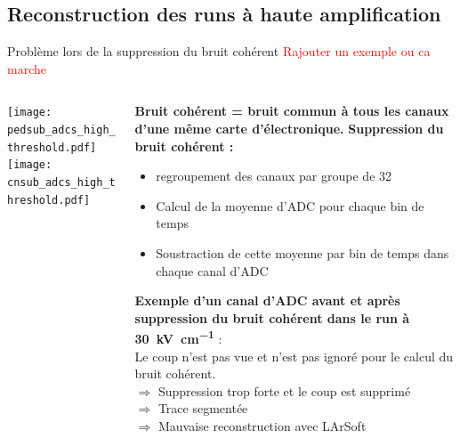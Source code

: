    \subsection{Reconstruction des runs à haute amplification}
    
    \begin{frame}{Problème lors de la suppression du bruit cohérent}
        \textcolor{red}{Rajouter un exemple ou ca marche}
        \begin{scriptsize}
            \begin{columns}
                \begin{column}{0.5\textwidth}
                    \centering \texttt{[image: pedsub\_adcs\_high\_threshold.pdf]}\\
                    \centering \texttt{[image: cnsub\_adcs\_high\_threshold.pdf]}\\
                 \end{column}
                \begin{column}{0.5\textwidth}
                    \textbf{Bruit cohérent = bruit commun à tous les canaux d'une même carte d'électronique.} 
                    \textbf{Suppression du bruit cohérent :} 
                    \begin{itemize}
                        \item regroupement des canaux par groupe de 32
                        \item Calcul de la moyenne d'ADC pour chaque bin de temps
                        \item Soustraction de cette moyenne par bin de temps dans chaque canal d'ADC
                    \end{itemize}
                   \textbf{ Exemple d'un canal d'ADC avant et après suppression du bruit cohérent dans le run à \SI{30}{\kilo\volt\per\centi\meter} }: \\Le coup n'est pas vue et n'est pas ignoré pour le calcul du bruit cohérent. \\
                   $\Rightarrow$ Suppression trop forte et le coup est supprimé \\
                   $\Rightarrow$ Trace segmentée \\
                   $\Rightarrow$ Mauvaise reconstruction avec LArSoft \\
                \end{column}
            \end{columns}
        \end{scriptsize}
    \end{frame}

